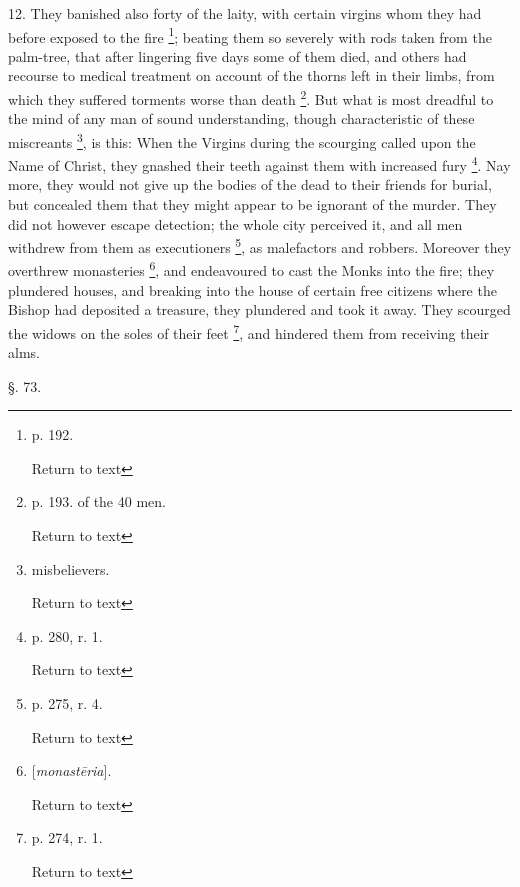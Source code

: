 12. They banished also forty of the laity, with
certain virgins whom they had before exposed to the fire \footnote{p. 192.

Return to text};
beating them so severely with rods taken from the palm-tree, that
after lingering five days some of them died, and others had recourse
to medical treatment on account of the thorns left in their limbs,
from which they suffered torments worse than death \footnote{p. 193. of the 40 men.

Return to text}. But what
is most dreadful to the mind of any man of sound understanding, though
characteristic of these miscreants \footnote{misbelievers.

Return to text}, is this: When the
Virgins during the scourging called upon the Name of Christ, they
gnashed their teeth against them with increased fury \footnote{p. 280, r. 1.

Return to text}. Nay
more, they would not give up the bodies of the dead to their friends
for burial, but concealed them that they might appear to be ignorant
of the murder. They did not however escape detection; the whole city
perceived it, and all men withdrew from them as executioners \footnote{p. 275, r. 4.

Return to text}, as malefactors and robbers. Moreover they overthrew monasteries
\footnote{[\emph{monast\={e}ria}].

Return to text}, and endeavoured to cast the Monks into the fire; they
plundered houses, and breaking into the house of certain free citizens
where the Bishop had deposited a treasure, they plundered and took it
away. They scourged the widows on the soles of their feet \footnote{p. 274, r. 1.

Return to text},
and hindered them from receiving their alms.

§. 73.

